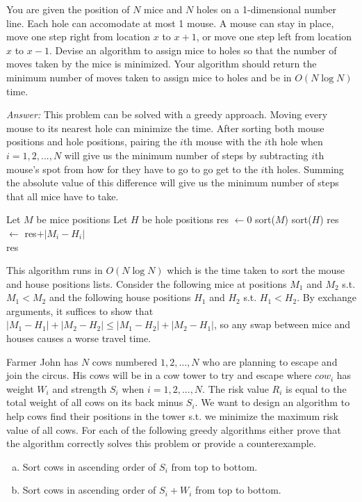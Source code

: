 \documentclass[12pt]{article}
\newenvironment{problem}[2][Problem]{\begin{trivlist}
\item[\hskip \labelsep {\bfseries #1}\hskip \labelsep {\bfseries #2.}]}{\end{trivlist}}
\begin{document}
\begin{problem}{4} 
You are given the position of $N$ mice and $N$ holes on a 1-dimensional number line. Each hole can accomodate at most 1 mouse. A mouse can stay in place, move one step right from location $x$ to $x+1$, or move one step left from location $x$ to $x-1$. Devise an algorithm to assign mice to holes so that the number of moves taken by the mice is minimized. Your algorithm should return the minimum number of moves taken to assign mice to holes and be in $O(N\log N)$ time.
\end{problem}
\textit{Answer:}
This problem can be solved with a greedy approach. Moving every mouse to its nearest hole can minimize the time. After sorting both mouse positions and hole positions, pairing the $i$th mouse with the $i$th hole when $i=1,2,...,N$ will give us the minimum number of steps by subtracting $i$th mouse's spot from how for they have to go to go get to the $i$th holes. Summing the absolute value of this difference will give us the minimum number of steps that all mice have to take.
\begin{algorithmic}
	\State Let $M$ be mice positions
	\State Let $H$ be hole positions
		\State res $\gets 0$
		\State sort($M$)
		\State sort($H$)
			\State res $\gets$ res$ + |M_i-H_i|$
		\EndFor\\
		\Return res
	\EndProcedure
\end{algorithmic}
This algorithm runs in $O(N\log N)$ which is the time taken to sort the mouse and house positions lists. Consider the following mice at positions $M_1$ and $M_2$ s.t. $M_1<M_2$ and the following house positions $H_1$ and $H_2$ s.t. $H_1<H_2$. By exchange arguments, it suffices to show that $|M_1-H_1|+|M_2-H_2|\leq|M_1-H_2|+|M_2-H_1|$, so any swap between mice and houses causes a worse travel time. 
\begin{problem}{5}
Farmer John has $N$ cows numbered $1, 2, ..., N$ who are planning to escape and join the circus. His cows will be in a cow tower to try and escape where $cow_i$ has weight $W_i$ and strength $S_i$ when $i=1,2,...,N$. The risk value $R_i$ is equal to the total weight of all cows on its back minus $S_i$. We want to design an algorithm to help cows find their positions in the tower s.t. we minimize the maximum risk value of all cows. For each of the following greedy algorithms either prove that the algorithm correctly solves this problem or provide a counterexample.
\begin{enumerate}[(a)]
	\item Sort cows in ascending order of $S_i$ from top to bottom.
	\item Sort cows in ascending order of $S_i+W_i$ from top to bottom.
\end{enumerate}
\end{problem}
\end{document}
